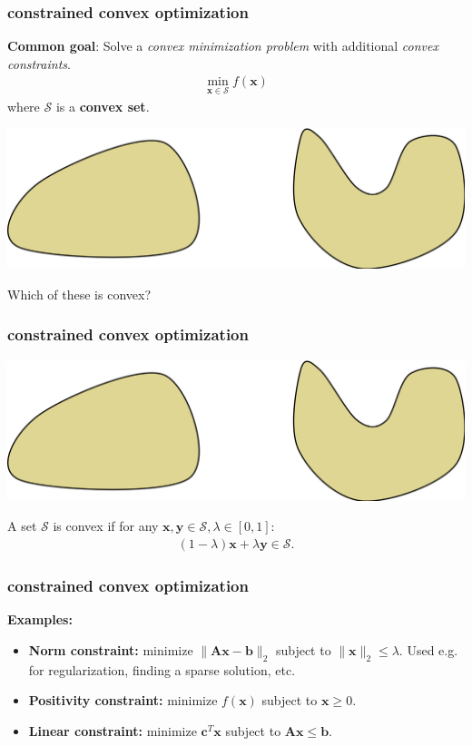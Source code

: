 \documentclass[compress]{beamer}
\newcommand{\bv}[1]{\mathbf{#1}}
\begin{document}
\begin{frame}[t]
	\frametitle{constrained convex optimization}
	\textbf{Common goal}: Solve a \emph{convex minimization problem} with additional \emph{convex constraints}.  
	\begin{align*}
		\min_{\bv{x}\in \mathcal{S}} f(\bv{x})
	\end{align*}
where $\mathcal{S}$ is a \textbf{\alert{convex set}}. 
\begin{center}
	\includegraphics[width=.7\textwidth]{sets.png}
	
	Which of these is convex?
\end{center}
\end{frame}

\begin{frame}[t]
	\frametitle{constrained convex optimization}
	\begin{center}
		\includegraphics[width=.7\textwidth]{sets.png}
	\end{center}

	\begin{definition}
		A set $\mathcal{S}$ is convex if for any $\bv{x}, \bv{y} \in \mathcal{S}, \lambda \in [0,1]$:
		\begin{align*}
			(1-\lambda)\bv{x} + \lambda\bv{y} \in \mathcal{S}.
		\end{align*}
	\end{definition}
\end{frame}

\begin{frame}[t]
	\frametitle{constrained convex optimization}
	\textbf{Examples:}
	\begin{itemize}
		\item \textbf{Norm constraint:} minimize $\|\bv{A}\bv{x} - \bv{b}\|_2$ subject to $\|\bv{x}\|_2 \leq \lambda$. Used e.g. for regularization, finding a sparse solution, etc.
		\item \textbf{Positivity constraint:} minimize $f(\bv{x})$ subject to $\bv{x} \geq 0$. 
		\item \textbf{Linear constraint:} minimize $\bv{c}^T\bv{x}$ subject to $\bv{A}\bv{x} \leq \bv{b}$. 
	\end{itemize}
\end{frame}
\end{document}
